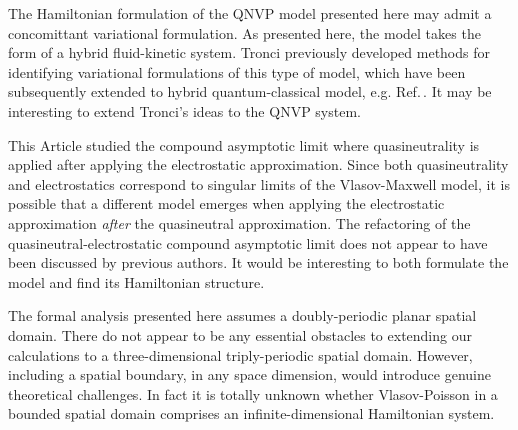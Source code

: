 \documentclass[%
 aip,
 amsmath,amssymb,
reprint, onecolumn %
]{revtex4-1}
\begin{document}
The Hamiltonian formulation of the QNVP model presented here may admit a concomittant variational formulation. As presented here, the model takes the form of a hybrid fluid-kinetic system. Tronci\cite{tronci_lagrangian_2013} previously developed methods for identifying variational formulations of this type of model, which have been subsequently extended to hybrid quantum-classical model, e.g. Ref.\,. It may be interesting to extend Tronci's ideas to the QNVP system.

This Article studied the compound asymptotic limit where quasineutrality is applied after applying the electrostatic approximation. Since both quasineutrality and electrostatics correspond to singular limits of the Vlasov-Maxwell model, it is possible that a different model emerges when applying the electrostatic approximation \emph{after} the quasineutral approximation. The refactoring of the quasineutral-electrostatic compound asymptotic limit does not appear to have been discussed by previous authors. It would be interesting to both formulate the model and find its Hamiltonian structure.

The formal analysis presented here assumes a doubly-periodic planar spatial domain. There do not appear to be any essential obstacles to extending our calculations to a three-dimensional triply-periodic spatial domain. However, including a spatial boundary, in any space dimension, would introduce genuine theoretical challenges. In fact it is totally unknown whether Vlasov-Poisson in a bounded spatial domain comprises an infinite-dimensional Hamiltonian system.
\end{document}
